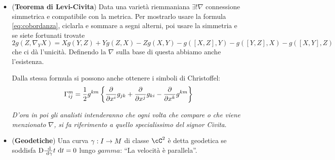 \documentclass[a4paper,NoNotes,GeneralMath]{stdmdoc}
\newcommand{\Dde}[1]{\ensuremath{\text{D} {#1}}{\de t}}
\begin{document}
\begin{itemize}
\item ({\bf Teorema di Levi-Civita}) Data una varietà riemmaniana $\exists! \nabla$ connessione simmetrica e compatibile con la metrica. Per mostrarlo usare la formula \ref{eq:cobordanza}, ciclarla e sommare a segni alterni, poi usare la simmetria e se siete fortunati trovate
  \begin{equation}
    \label{eq:levi_civita}
    2 g(Z, \nabla_Y X) = X g(Y, Z) + Y g(Z, X) - Z g(X, Y) - g([X, Z], Y) - g([Y, Z], X) - g([X, Y], Z)
  \end{equation}
  che ci dà l'unicità. Definendo la $\nabla$ sulla base di questa abbiamo anche l'esistenza.

  Dalla stessa formula si possono anche ottenere i simboli di Christoffel:
  $$ \Gamma_{ij}^m = \frac{1}{2} g^{km} \left\{ \dpar{}{x^i} g_{jk} + \dpar{}{x^j} g_{ki} - \dpar{}{x^k} g^{km} \right\} $$

  {\it D'ora in poi gli analisti intenderanno che ogni volta che compare o che viene menzionato $\nabla$, si fa riferimento a quello specialissimo del signor Civita}.
\item ({\bf Geodetiche}) Una curva $\gamma: I \rightarrow M$ di classe $\cC^2$ è detta geodetica se soddisfa $\Dde{\dde{\gamma}{t}} = 0$ lungo $gamma$: ``La velocità è parallela''.
\end{itemize}
\end{document}

